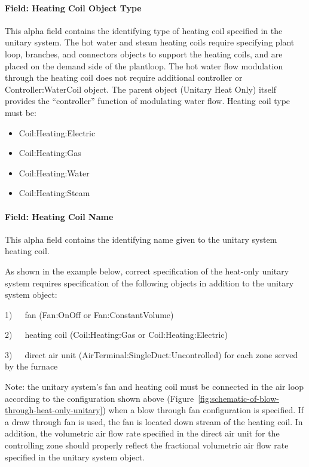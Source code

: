 \paragraph{Field: Heating Coil Object Type}\label{field-heating-coil-object-type-6}

This alpha field contains the identifying type of heating coil specified in the unitary system. The hot water and steam heating coils require specifying plant loop, branches, and connectors objects to support the heating coils, and are placed on the demand side of the plantloop. The hot water flow modulation through the heating coil does not require additional controller or Controller:WaterCoil object. The parent object (Unitary Heat Only) itself provides the ``controller'' function of modulating water flow. Heating coil type must be:

\begin{itemize}
\item
  Coil:Heating:Electric
\item
  Coil:Heating:Gas
\item
  Coil:Heating:Water
\item
  Coil:Heating:Steam
\end{itemize}

\paragraph{Field: Heating Coil Name}\label{field-heating-coil-name-6}

This alpha field contains the identifying name given to the unitary system heating coil.

As shown in the example below, correct specification of the heat-only unitary system requires specification of the following objects in addition to the unitary system object:

1)~~~fan (Fan:OnOff or Fan:ConstantVolume)

2)~~~heating coil (Coil:Heating:Gas or Coil:Heating:Electric)

3)~~~direct air unit (AirTerminal:SingleDuct:Uncontrolled) for each zone served by the furnace

Note: the unitary system's fan and heating coil must be connected in the air loop according to the configuration shown above (Figure~\ref{fig:schematic-of-blow-through-heat-only-unitary}) when a blow through fan configuration is specified. If a draw through fan is used, the fan is located down stream of the heating coil. In addition, the volumetric air flow rate specified in the direct air unit for the controlling zone should properly reflect the fractional volumetric air flow rate specified in the unitary system object.

